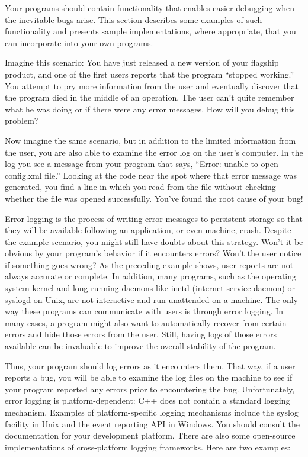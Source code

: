 
Your programs should contain functionality that enables easier debugging when the inevitable bugs arise. This section describes some examples of such functionality and presents sample implementations, where appropriate, that you can incorporate into your own programs.


Imagine this scenario: You have just released a new version of your flagship product, and one of the first users reports that the program “stopped working.” You attempt to pry more information from the user and eventually discover that the program died in the middle of an operation. The user can’t quite remember what he was doing or if there were any error messages. How will you debug this problem?

Now imagine the same scenario, but in addition to the limited information from the user, you are also able to examine the error log on the user’s computer. In the log you see a message from your program that says, “Error: unable to open config.xml file.” Looking at the code near the spot where that error message was generated, you find a line in which you read from the file without checking whether the file was opened successfully. You’ve found the root cause of your bug!

Error logging is the process of writing error messages to persistent storage so that they will be available following an application, or even machine, crash. Despite the example scenario, you might still have doubts about this strategy. Won’t it be obvious by your program’s behavior if it encounters errors? Won’t the user notice if something goes wrong? As the preceding example shows, user reports are not always accurate or complete. In addition, many programs, such as the operating system kernel and long-running daemons like inetd (internet service daemon) or syslogd on Unix, are not interactive and run unattended on a machine. The only way these programs can communicate with users is through error logging. In many cases, a program might also want to automatically recover from certain errors and hide those errors from the user. Still, having logs of those errors available can be invaluable to improve the overall stability of the program.

Thus, your program should log errors as it encounters them. That way, if a user reports a bug, you will be able to examine the log files on the machine to see if your program reported any errors prior to encountering the bug. Unfortunately, error logging is platform-dependent: C++ does not contain a standard logging mechanism. Examples of platform-specific logging mechanisms include the syslog facility in Unix and the event reporting API in Windows. You should consult the documentation for your development platform. There are also some open-source implementations of cross-platform logging frameworks. Here are two examples:

